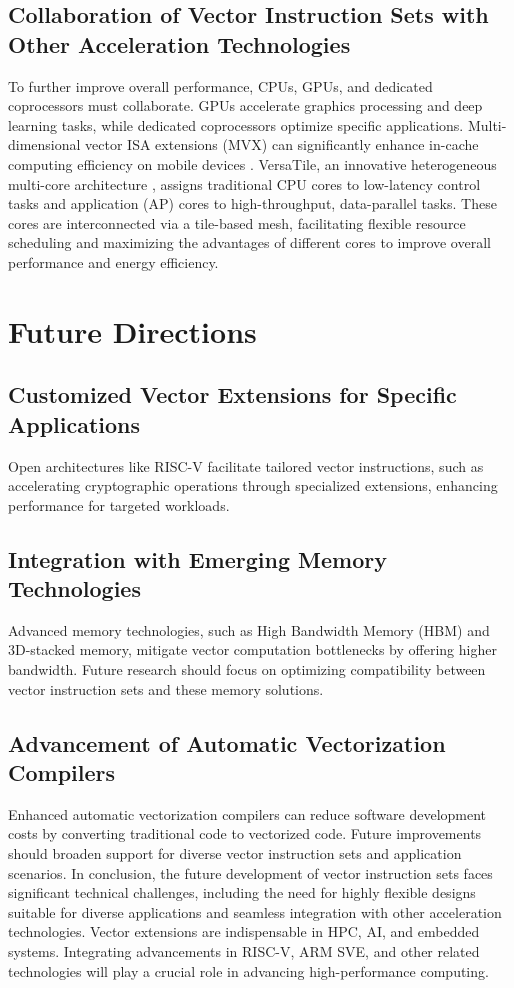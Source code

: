 \documentclass[conference]{IEEEtran}
\begin{document}
\subsection{Collaboration of Vector Instruction Sets with Other Acceleration Technologies \cite{b18}\cite{b25}}
To further improve overall performance, CPUs, GPUs, and dedicated coprocessors must collaborate. GPUs accelerate graphics processing and deep learning tasks, while dedicated coprocessors optimize specific applications. Multi-dimensional vector ISA extensions (MVX) can significantly enhance in-cache computing efficiency on mobile devices \cite{b18}. VersaTile, an innovative heterogeneous multi-core architecture \cite{b25}, assigns traditional CPU cores to low-latency control tasks and application (AP) cores to high-throughput, data-parallel tasks. These cores are interconnected via a tile-based mesh, facilitating flexible resource scheduling and maximizing the advantages of different cores to improve overall performance and energy efficiency.

\section{Future Directions}
\subsection{Customized Vector Extensions for Specific Applications} Open architectures like RISC-V facilitate tailored vector instructions, such as accelerating cryptographic operations through specialized extensions, enhancing performance for targeted workloads.
\subsection{Integration with Emerging Memory Technologies} Advanced memory technologies, such as High Bandwidth Memory (HBM) and 3D-stacked memory, mitigate vector computation bottlenecks by offering higher bandwidth. Future research should focus on optimizing compatibility between vector instruction sets and these memory solutions.
\subsection{Advancement of Automatic Vectorization Compilers} Enhanced automatic vectorization compilers can reduce software development costs by converting traditional code to vectorized code. Future improvements should broaden support for diverse vector instruction sets and application scenarios.
In conclusion, the future development of vector instruction sets faces significant technical challenges, including the need for highly flexible designs suitable for diverse applications and seamless integration with other acceleration technologies. Vector extensions are indispensable in HPC, AI, and embedded systems. Integrating advancements in RISC-V, ARM SVE, and other related technologies will play a crucial role in advancing high-performance computing.
\end{document}
